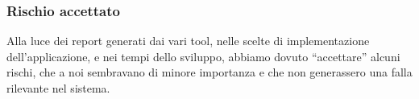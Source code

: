 \documentclass{article}
\begin{document}
\subsubsection{Rischio accettato}
Alla luce dei report generati dai vari tool, nelle scelte di implementazione dell'applicazione, e nei tempi dello sviluppo, abbiamo dovuto ``accettare'' alcuni rischi, che a noi sembravano di minore importanza e che non generassero una falla rilevante nel sistema.
\end{document}
